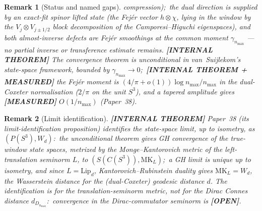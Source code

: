 \documentclass[11pt]{article}
\newtheorem{remark}{Remark}
\begin{document}
\begin{remark}[Status and named gaps]
compression);\ the dual direction is supplied by an exact-fit spinor
lifted state (the Fej\'er vector $h \otimes \chi$, lying in the
window by the $V_j \otimes V_{j \pm 1/2}$ block decomposition of the
Camporesi--Higuchi eigenspaces), and both almost-inverse defects are
Fej\'er smoothings at the common moment $\gamma_{n_{\max}}$ --- no
partial inverse or transference estimate remains.
\textbf{[INTERNAL THEOREM]} The convergence
theorem is unconditional in van~Suijlekom's state-space framework,
bounded by $\gamma_{n_{\max}} \to 0$;\ \textbf{[INTERNAL THEOREM +
MEASURED]} the Fej\'er moment is $(4/\pi + o(1))\log n_{\max}/n_{\max}$
in the dual-Coxeter normalisation ($2/\pi$ on the unit $S^3$), and a
tapered amplitude gives \textbf{[MEASURED]} $O(1/n_{\max})$ (Paper~38).
\end{remark}

\begin{remark}[Limit identification]
\label{rem:gh_limit_id}
\textbf{[INTERNAL THEOREM]} Paper~38 (its limit-identification proposition)
identifies the state-space limit, \emph{up to isometry}, as
$(P(S^3), W_d)$:\ the unconditional theorem gives GH convergence of the
true-window state spaces, metrized by the Monge--Kantorovich metric of
the left-translation seminorm $L$, to $(S(C(S^3)), \mathrm{MK}_L)$;\ a GH
limit is unique up to isometry, and since $L = \mathrm{Lip}_d$,
Kantorovich--Rubinstein duality gives $\mathrm{MK}_L = W_d$, the
Wasserstein distance for the (dual-Coxeter) geodesic distance $d$.  The
identification is for the translation-seminorm metric, not for the
Dirac Connes distance $d_{D_{n_{\max}}}$:\ convergence in the
Dirac-commutator seminorm is \textbf{[OPEN]}.
\end{remark}
\end{document}
